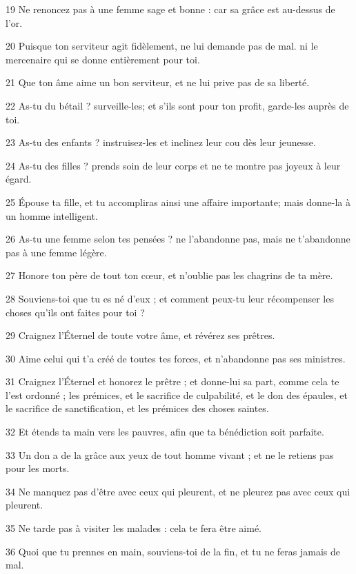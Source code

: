 \par 19 Ne renoncez pas à une femme sage et bonne : car sa grâce est au-dessus de l'or.
\par 20 Puisque ton serviteur agit fidèlement, ne lui demande pas de mal. ni le mercenaire qui se donne entièrement pour toi.
\par 21 Que ton âme aime un bon serviteur, et ne lui prive pas de sa liberté.
\par 22 As-tu du bétail ? surveille-les; et s'ils sont pour ton profit, garde-les auprès de toi.
\par 23 As-tu des enfants ? instruisez-les et inclinez leur cou dès leur jeunesse.
\par 24 As-tu des filles ? prends soin de leur corps et ne te montre pas joyeux à leur égard.
\par 25 Épouse ta fille, et tu accompliras ainsi une affaire importante; mais donne-la à un homme intelligent.
\par 26 As-tu une femme selon tes pensées ? ne l'abandonne pas, mais ne t'abandonne pas à une femme légère.
\par 27 Honore ton père de tout ton cœur, et n'oublie pas les chagrins de ta mère.
\par 28 Souviens-toi que tu es né d'eux ; et comment peux-tu leur récompenser les choses qu'ils ont faites pour toi ?
\par 29 Craignez l'Éternel de toute votre âme, et révérez ses prêtres.
\par 30 Aime celui qui t'a créé de toutes tes forces, et n'abandonne pas ses ministres.
\par 31 Craignez l'Éternel et honorez le prêtre ; et donne-lui sa part, comme cela te l'est ordonné ; les prémices, et le sacrifice de culpabilité, et le don des épaules, et le sacrifice de sanctification, et les prémices des choses saintes.
\par 32 Et étends ta main vers les pauvres, afin que ta bénédiction soit parfaite.
\par 33 Un don a de la grâce aux yeux de tout homme vivant ; et ne le retiens pas pour les morts.
\par 34 Ne manquez pas d'être avec ceux qui pleurent, et ne pleurez pas avec ceux qui pleurent.
\par 35 Ne tarde pas à visiter les malades : cela te fera être aimé.
\par 36 Quoi que tu prennes en main, souviens-toi de la fin, et tu ne feras jamais de mal.


